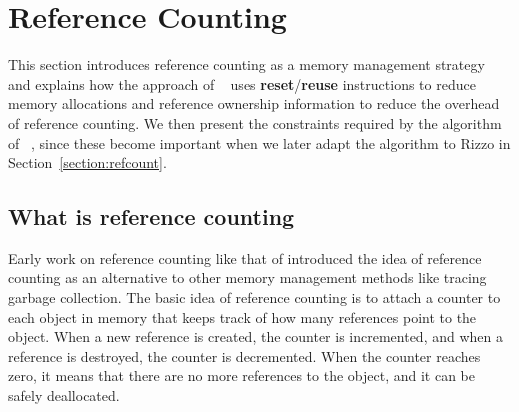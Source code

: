 \section{Reference Counting}


This section introduces reference counting as a memory management strategy and explains how the approach of \citeauthor*{ullrich_counting_2021}~\cite{ullrich_counting_2021} uses \textbf{reset}/\textbf{reuse} instructions to reduce memory allocations and reference ownership information to reduce the overhead of reference counting.
We then present the constraints required by the algorithm of \citeauthor*{ullrich_counting_2021}~\cite{ullrich_counting_2021}, since these become important when we later adapt the algorithm to Rizzo in Section~\ref{section:refcount}.



\subsection{What is reference counting}
Early work on reference counting like that of \citeauthor*{collins_method_1960} \cite{collins_method_1960}
introduced the idea of reference counting as an alternative to other memory management methods like tracing garbage collection. The basic idea of reference counting is to attach a counter to each object in memory that keeps track of how many references point to the object. When a new reference is created, the counter is incremented, and when a reference is destroyed, the counter is decremented. When the counter reaches zero, it means that there are no more references to the object, and it can be safely deallocated.

